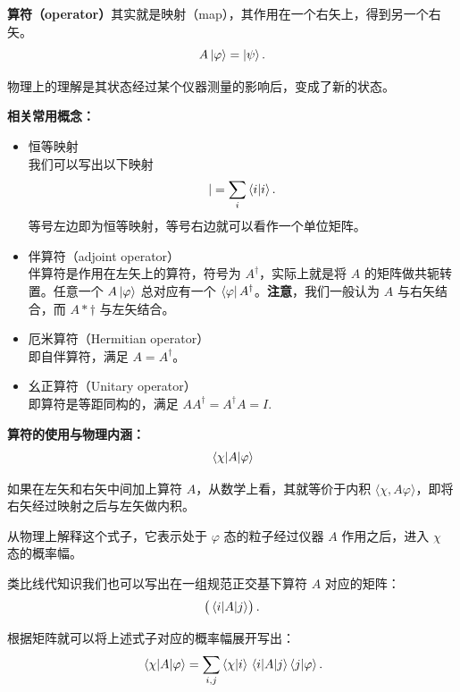\documentclass[12pt,a4paper,oneside]{book}
\begin{document}
\begin{tcolorbox}[before upper={\parindent20pt},title=\textit{算符},breakable,fontupper=\footnotesize,colframe=blue!40!white,colback=blue!5!white]
    \textbf{算符（operator）}其实就是映射（map），其作用在一个右矢上，得到另一个右矢。
    \begin{equation}
        A\ket{\varphi}=\ket{\psi}. 
    \end{equation}

    物理上的理解是其状态经过某个仪器测量的影响后，变成了新的状态。

    \noindent\textbf{相关常用概念：}
    \begin{itemize}
        \item 恒等映射\\我们可以写出以下映射
        \begin{equation}
            |=\sum_i\braket{i}{i}. 
        \end{equation}
        等号左边即为恒等映射，等号右边就可以看作一个单位矩阵。
        \item 伴算符（adjoint operator）\\伴算符是作用在左矢上的算符，符号为 $A^\dagger$，实际上就是将 $A$ 的矩阵做共轭转置。任意一个 $A\ket{\varphi}$ 总对应有一个 $\bra{\varphi}A^\dagger$。\textbf{注意}，我们一般认为 $A$ 与右矢结合，而 $A*\dagger$ 与左矢结合。 
        \item 厄米算符（Hermitian operator）\\即自伴算符，满足 $ A=A^\dagger $。
        \item 幺正算符（Unitary operator）\\即算符是等距同构的，满足 $ AA^\dagger = A^\dagger A = I. $
    \end{itemize}

    \noindent\textbf{算符的使用与物理内涵：}
    \begin{equation*}
        \mel{\chi}{A}{\varphi}
    \end{equation*}

    如果在左矢和右矢中间加上算符 $A$，从数学上看，其就等价于内积 $\langle\chi,A\varphi\rangle$，即将右矢经过映射之后与左矢做内积。

    从物理上解释这个式子，它表示处于 $\varphi$ 态的粒子经过仪器 $A$ 作用之后，进入 $\chi$ 态的概率幅。

    类比线代知识我们也可以写出在一组规范正交基下算符 $A$ 对应的矩阵：
    \begin{equation*}
        \begin{pmatrix}
            \mel{i}{A}{j}
        \end{pmatrix}.    
    \end{equation*}

    根据矩阵就可以将上述式子对应的概率幅展开写出：
    \begin{equation}
        \mel{\chi}{A}{\varphi}=\sum_{i, j}\braket{\chi}{i}\mel{i}{A}{j}\braket{j}{\varphi}.
    \end{equation}
\end{tcolorbox}
\end{document}
